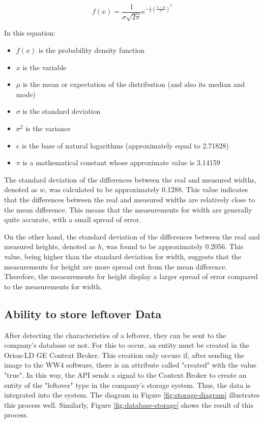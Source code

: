 \begin{equation}
f(x) = \frac{1}{\sigma\sqrt{2\pi}} e^{ -\frac{1}{2} \left( \frac{x-\mu}{\sigma} \right)^2 }
\label{eq:gaussD}
\end{equation}

In this equation: 
\begin{itemize}
\item \(f(x)\) is the probability density function
\item \(x\) is the variable
\item \(\mu\) is the mean or expectation of the distribution (and also its median and mode)
\item \(\sigma\) is the standard deviation
\item \(\sigma^2\) is the variance
\item \(e\) is the base of natural logarithms (approximately equal to 2.71828)
\item \(\pi\) is a mathematical constant whose approximate value is 3.14159
\end{itemize}

The standard deviation of the differences between the real and measured widths, denoted as $w$, was calculated to be approximately 0.1288. This value indicates that the differences between the real and measured widths are relatively close to the mean difference. This means that the measurements for width are generally quite accurate, with a small spread of error.

On the other hand, the standard deviation of the differences between the real and measured heights, denoted as $h$, was found to be approximately 0.2056. This value, being higher than the standard deviation for width, suggests that the measurements for height are more spread out from the mean difference. Therefore, the measurements for height display a larger spread of error compared to the measurements for width.

\newpage
\subsection{Ability to store leftover Data}
After detecting the characteristics of a leftover, they can be sent to the company's database or not. For this to occur, an entity must be created in the Orion-LD GE Context Broker. This creation only occurs if, after sending the image to the WW4 software, there is an attribute called "created" with the value "true". In this way, the API sends a signal to the Context Broker to create an entity of the "leftover" type in the company's storage system. Thus, the data is integrated into the system. The diagram in Figure \ref{fig:storage-diagram} illustrates this process well. Similarly, Figure \ref{fig:database-storage} shows the result of this process.

